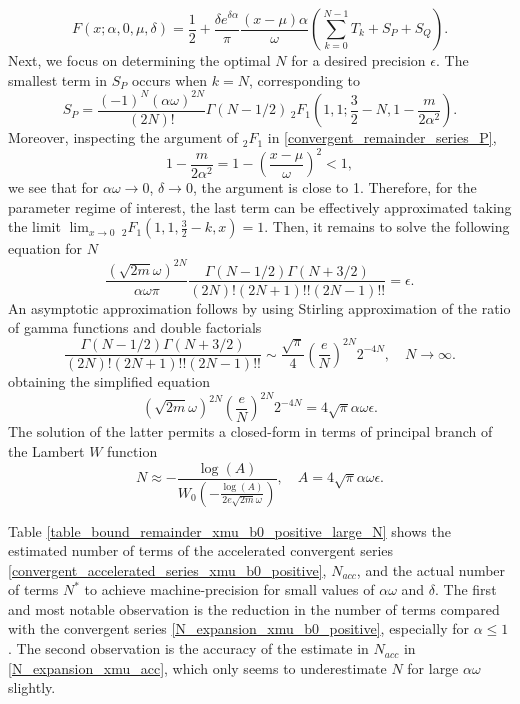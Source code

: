 \documentclass[10pt,a4paper,oneside]{article}
\numberwithin{equation}{section}
\begin{document}
\begin{equation}\label{convergent_accelerated_series_xmu_b0_positive}
F(x;\alpha, 0, \mu, \delta) = \frac{1}{2} + \frac{\delta e^{\delta \alpha}}{\pi} \frac{(x-\mu)\alpha}{\omega} \left(\sum_{k=0}^{N-1} T_k + S_P + S_Q\right).
\end{equation}
Next, we focus on determining the optimal $N$ for a desired precision $\epsilon$. The smallest term in $S_P$ occurs when $k=N$, corresponding to
\begin{equation}
S_P = \frac{(-1)^N (\alpha\omega)^{2N}}{(2N)!} \Gamma(N - 1/2) \, _2F_1\left(1, 1; \frac{3}{2} -N, 1 - \frac{m}{2\alpha^2}\right).
\end{equation}
Moreover, inspecting the argument of $_2F_1$ in \eqref{convergent_remainder_series_P},
\begin{equation}
1 - \frac{m}{2\alpha^2} = 1 - \left(\frac{x-\mu}{\omega}\right)^2 < 1,
\end{equation}
we see that for $\alpha \omega \to 0$, $\delta \to 0$, the argument is close to 1. Therefore, for the parameter regime of interest, the last term can be effectively approximated taking the limit $\lim_{x \to 0}\, _2F_1\left(1, 1, \frac{3}{2}-k, x\right) = 1$. Then, it remains to solve the following equation for $N$ 
\begin{equation}
\frac{(\sqrt{2m} \omega)^{2N}}{\alpha\omega \pi} \frac{\Gamma(N - 1/2)\Gamma(N + 3/2)}{(2N)!(2N + 1)!! (2N - 1)!!} = \epsilon.
\end{equation}
An asymptotic approximation follows by using Stirling approximation of the ratio of gamma functions and double factorials
\begin{equation}
\frac{\Gamma(N - 1/2)\Gamma(N + 3/2)}{(2N)!(2N + 1)!! (2N - 1)!!} \sim \frac{\sqrt{\pi}}{4} \left(\frac{e}{N}\right)^{2N} 2^{-4N}, \quad N \to \infty.
\end{equation}
obtaining the simplified equation
\begin{equation}
(\sqrt{2m} \omega)^{2N} \left(\frac{e}{N}\right)^{2N} 2^{-4N} = 4\sqrt{\pi}\alpha\omega\epsilon.
\end{equation}
The solution of the latter permits a closed-form in terms of principal branch of the Lambert $W$ function
\begin{equation}\label{N_expansion_xmu_acc}
N \approx - \frac{\log(A)}{W_0\left(-\frac{\log(A)}{2 e \sqrt{2m} \omega} \right)}, \quad A = 4\sqrt{\pi}\alpha\omega\epsilon.
\end{equation}

Table \ref{table_bound_remainder_xmu_b0_positive_large_N} shows the estimated number of terms of the accelerated convergent series \eqref{convergent_accelerated_series_xmu_b0_positive}, $N_{acc}$, and the actual number of terms $N^*$ to achieve machine-precision for small values of $\alpha\omega$ and $\delta$. The first and most notable observation is the reduction in the number of terms compared with the convergent series \eqref{N_expansion_xmu_b0_positive}, especially for $\alpha \le 1$. The second observation is the accuracy of the estimate in $N_{acc}$ in \eqref{N_expansion_xmu_acc}, which only seems to underestimate $N$ for large $\alpha\omega$ slightly.
\end{document}
